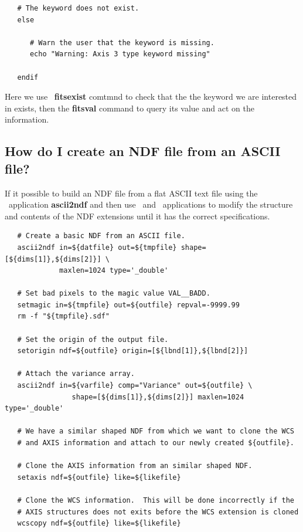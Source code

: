 \documentclass[twoside,11pt]{article}
\newcommand{\xref}[3]{#1}
\newcommand{\xlabel}[1]{}
\begin{document}
{\begin{verbatim}
   # The keyword does not exist.
   else
   
      # Warn the user that the keyword is missing.
      echo "Warning: Axis 3 type keyword missing"
      
   endif
\end{verbatim}\normalsize

Here we use \KAPPA\ \xref{{\bf fitsexist}}{sun95}{FITSEXIST} comtmnd to check
that the the keyword we are interested in exists, then the
{\bf fitsval} command to query its value and act on
the information.

\subsection{\xlabel{sc16_newndf}How do I create an NDF file from an ASCII file?\label{sc16_newndf}}

If it possible to build an \xref{NDF}{sun33}{} file from a flat ASCII
text file using the \CONVERT\ application
\xref{{\bf ascii2ndf}}{sun55}{ASCII2NDF} and then use \KAPPAref\ and
\DATACUBEref\ applications to modify the structure and contents of the
NDF extensions until it has the correct specifications.

\small\begin{verbatim}
   # Create a basic NDF from an ASCII file.
   ascii2ndf in=${datfile} out=${tmpfile} shape=[${dims[1]},${dims[2]}] \
             maxlen=1024 type='_double'

   # Set bad pixels to the magic value VAL__BADD.
   setmagic in=${tmpfile} out=${outfile} repval=-9999.99 
   rm -f "${tmpfile}.sdf"

   # Set the origin of the output file.
   setorigin ndf=${outfile} origin=[${lbnd[1]},${lbnd[2]}] 

   # Attach the variance array.
   ascii2ndf in=${varfile} comp="Variance" out=${outfile} \
                shape=[${dims[1]},${dims[2]}] maxlen=1024 type='_double' 

   # We have a similar shaped NDF from which we want to clone the WCS
   # and AXIS information and attach to our newly created ${outfile}.
   
   # Clone the AXIS information from an similar shaped NDF.
   setaxis ndf=${outfile} like=${likefile}
   
   # Clone the WCS information.  This will be done incorrectly if the
   # AXIS structures does not exits before the WCS extension is cloned
   wcscopy ndf=${outfile} like=${likefile}
\end{verbatim}\normalsize

}
\end{document}
